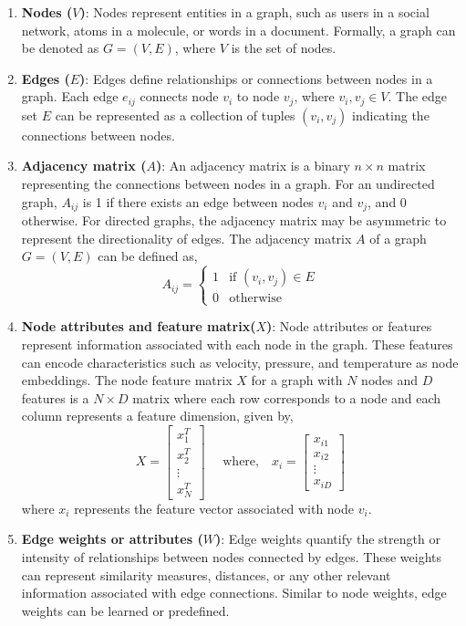 \begin{enumerate}
  \item \textbf{Nodes (\(V\))}: Nodes represent entities in a graph, such as users in a social network, atoms in a molecule, or words in a document. Formally, a graph can be denoted as \( G = (V, E) \), where \( V \) is the set of nodes.
  \item \textbf{Edges (\(E\))}: Edges define relationships or connections between nodes in a graph. Each edge \( e_{ij} \) connects node \( v_i \) to node \( v_j \), where \( v_i, v_j \in V \). The edge set \( E \) can be represented as a collection of tuples \( (v_i, v_j) \) indicating the connections between nodes.
  \item \textbf{Adjacency matrix (\(A\))}: An adjacency matrix is a binary $n \times n$ matrix representing the connections between nodes in a graph. For an undirected graph, \( A_{ij} \) is 1 if there exists an edge between nodes \( v_i \) and \( v_j \), and 0 otherwise. For directed graphs, the adjacency matrix may be asymmetric to represent the directionality of edges. The adjacency matrix \( A \) of a graph \( G = (V, E) \) can be defined as,
  \[
  A_{ij} = \begin{cases} 1 & \text{if } (v_i, v_j) \in E \\ 0 & \text{otherwise} \end{cases}
  \]
  \item \textbf{Node attributes and feature matrix(\(X\))}: Node attributes or features represent information associated with each node in the graph. These features can encode characteristics such as velocity, pressure, and temperature as node embeddings. The node feature matrix $X$ for a graph with \( N \) nodes and \( D \) features is a $N \times D$ matrix where each row corresponds to a node and each column represents a feature dimension, given by,
\begin{equation*}
  X = \begin{bmatrix} x_1^T \\ x_2^T \\ \vdots \\ x_N^T \end{bmatrix} \quad \text{ where,} \quad x_i = \begin{bmatrix} x_{i1} \\ x_{i2} \\ \vdots \\ x_{iD} \end{bmatrix}
\end{equation*}
where \( x_i \) represents the feature vector associated with node \(v_i \).
  \item \textbf{Edge weights or attributes (\(W\))}: Edge weights quantify the strength or intensity of relationships between nodes connected by edges. These weights can represent similarity measures, distances, or any other relevant information associated with edge connections. Similar to node weights, edge weights can be learned or predefined. 
\end{enumerate}  
